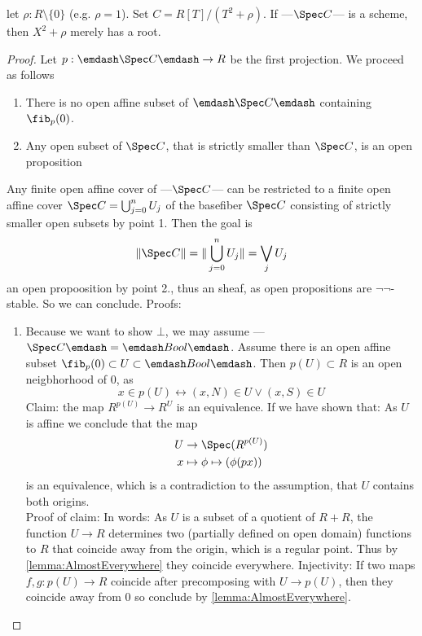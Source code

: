 \begin{prop}
	let $\rho : R \setminus \{0\}$ (e.g. $\rho = 1$). Set $C = R[T] / (T^2 + \rho)$. If ---$\Spec C$--- is a scheme, then $X^2 + \rho$ merely has a root.
\end{prop}
\begin{proof}
	Let $p : \emdash \Spec C \emdash \to R$ be the first projection.
	We proceed as follows
	\begin{enumerate}
		\item  There is no open affine subset of $\emdash \Spec C \emdash$ containing $\fib_p(0)$.
		\item Any open subset of $\Spec C$, that is strictly smaller than $\Spec C$, is an open proposition
	\end{enumerate}
	Any finite open affine cover of ---$\Spec C$--- can be restricted to a finite open affine cover $\Spec C = \bigcup_{j=0}^{n} U_j$ of the basefiber $\Spec C$ consisting of strictly smaller open subsets by point 1.
	Then the goal is
	\[
	\| \Spec C \| = \| \bigcup_{j=0}^{n} U_j \| = \bigvee_j  U_j
	\]
	an open propoosition by point 2., thus an \etale sheaf, as open propositions are $\lnot \lnot$-stable. So we can conclude.
	Proofs:
	\begin{enumerate}
		\item Because we want to show $\bot$, we may assume ---$\Spec C \emdash = \emdash Bool \emdash$. Assume there is an open affine subset $\fib_p(0) \subset U \subset \emdash Bool \emdash$. Then $p(U) \subset R$ is an open neigbhorhood of 0, as 
		\[
		x \in p(U) \leftrightarrow (x,N) \in U \lor (x,S) \in U
		\]
		Claim: the map $R^{p(U)} \to R^U$ is an equivalence. If we have shown that: As $U$ is affine we conclude that the map
		\begin{align*}
			U &\to \Spec (R^{p(U)}) \\
			x &\mapsto \phi \mapsto (\phi(px))		
		\end{align*}
		is an equivalence, which is a contradiction to the assumption, that $U$ contains both origins. \\
		Proof of claim: 
		In words: As $U$ is a subset of a quotient of $R + R$, the function $U \to R$ determines two (partially defined on open domain) functions to $R$ that coincide away from the origin, which is a regular point. Thus by \ref{lemma:AlmostEverywhere} they coincide everywhere.
		Injectivity: If two maps $f , g : p(U) \to R$ coincide after precomposing with $U \to p(U)$, then they coincide away from $0$
		so conclude by \ref{lemma:AlmostEverywhere}. \\

\end{enumerate}
\end{proof}
